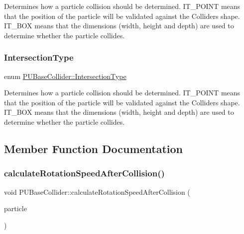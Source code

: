 Determines how a particle collision should be determined. I\+T\+\_\+\+P\+O\+I\+NT means that the position of the particle will be validated against the Colliders\textquotesingle{} shape. I\+T\+\_\+\+B\+OX means that the dimensions (width, height and depth) are used to determine whether the particle collides. \mbox{\label{classPUBaseCollider_ae86fc81f78c00a88e8e927377a86e81c}} 
\subsubsection{\texorpdfstring{Intersection\+Type}{IntersectionType}\hspace{0.1cm}{\footnotesize\ttfamily [2/2]}}
{\footnotesize\ttfamily enum \hyperlink{classPUBaseCollider_ae86fc81f78c00a88e8e927377a86e81c}{P\+U\+Base\+Collider\+::\+Intersection\+Type}}

Determines how a particle collision should be determined. I\+T\+\_\+\+P\+O\+I\+NT means that the position of the particle will be validated against the Colliders\textquotesingle{} shape. I\+T\+\_\+\+B\+OX means that the dimensions (width, height and depth) are used to determine whether the particle collides. 

\subsection{Member Function Documentation}
\mbox{\label{classPUBaseCollider_a96e9b27b4c2d2dac1bd47b7531a4598f}} 
\subsubsection{\texorpdfstring{calculate\+Rotation\+Speed\+After\+Collision()}{calculateRotationSpeedAfterCollision()}\hspace{0.1cm}{\footnotesize\ttfamily [1/2]}}
{\footnotesize\ttfamily void P\+U\+Base\+Collider\+::calculate\+Rotation\+Speed\+After\+Collision (\begin{DoxyParamCaption}\item[{\hyperlink{structPUParticle3D}{P\+U\+Particle3D} $\ast$}]{particle }\end{DoxyParamCaption})}

